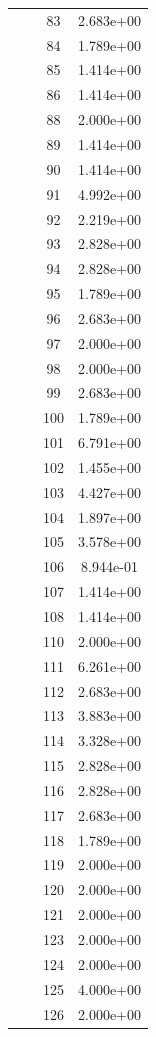 \documentclass[12pt]{article}
\begin{document}
\begin{longtable}{@{}cccc@{}}
 &  & 83 & 2.683e+00 \\
 &  & 84 & 1.789e+00 \\
 &  & 85 & 1.414e+00 \\
 &  & 86 & 1.414e+00 \\
 &  & 88 & 2.000e+00 \\
 &  & 89 & 1.414e+00 \\
 &  & 90 & 1.414e+00 \\
 &  & 91 & 4.992e+00 \\
 &  & 92 & 2.219e+00 \\
 &  & 93 & 2.828e+00 \\
 &  & 94 & 2.828e+00 \\
 &  & 95 & 1.789e+00 \\
 &  & 96 & 2.683e+00 \\
 &  & 97 & 2.000e+00 \\
 &  & 98 & 2.000e+00 \\
 &  & 99 & 2.683e+00 \\
 &  & 100 & 1.789e+00 \\
 &  & 101 & 6.791e+00 \\
 &  & 102 & 1.455e+00 \\
 &  & 103 & 4.427e+00 \\
 &  & 104 & 1.897e+00 \\
 &  & 105 & 3.578e+00 \\
 &  & 106 & 8.944e-01 \\
 &  & 107 & 1.414e+00 \\
 &  & 108 & 1.414e+00 \\
 &  & 110 & 2.000e+00 \\
 &  & 111 & 6.261e+00 \\
 &  & 112 & 2.683e+00 \\
 &  & 113 & 3.883e+00 \\
 &  & 114 & 3.328e+00 \\
 &  & 115 & 2.828e+00 \\
 &  & 116 & 2.828e+00 \\
 &  & 117 & 2.683e+00 \\
 &  & 118 & 1.789e+00 \\
 &  & 119 & 2.000e+00 \\
 &  & 120 & 2.000e+00 \\
 &  & 121 & 2.000e+00 \\
 &  & 123 & 2.000e+00 \\
 &  & 124 & 2.000e+00 \\
 &  & 125 & 4.000e+00 \\
 &  & 126 & 2.000e+00 \\

\end{longtable}
\end{document}
